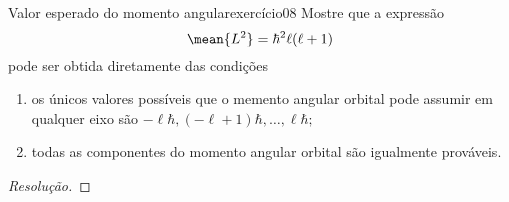 \begin{exercício}{Valor esperado do momento angular}{exercício08}
    Mostre que a expressão
    \begin{equation*}
        \mean{L^2} = \hbar^2 \ell(\ell + 1)
    \end{equation*}
    pode ser obtida diretamente das condições
    \begin{enumerate}[label=(\alph*)]
        \item os únicos valores possíveis que o memento angular orbital pode assumir em qualquer eixo são \(- \ell \hbar, (-\ell + 1)\hbar, \dots, \ell\hbar;\)
        \item todas as componentes do momento angular orbital são igualmente prováveis.
    \end{enumerate}
\end{exercício}
\begin{proof}[Resolução]

\end{proof}
